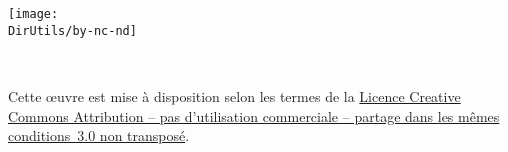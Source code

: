 \noindent\texttt{[image: \\DirUtils/by-nc-nd]}

\noindent\textcopyright~\SL

\noindent Cette {\oe}uvre est mise à disposition selon les termes de 
la \href{http://creativecommons.org/licenses/by-nc-sa/3.0/}{Licence 
Creative Commons Attribution -- pas d'utilisation commerciale -- partage 
dans les mêmes conditions~3.0 non transposé}.
